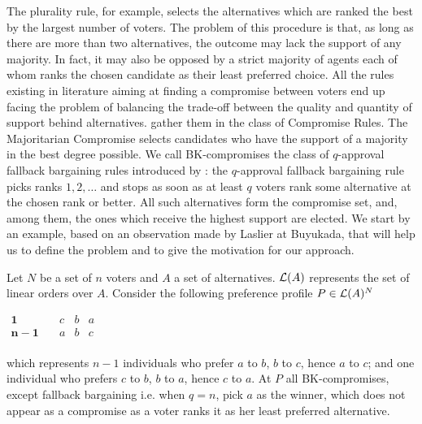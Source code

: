 \documentclass[version=3.21, pagesize, twoside=off, bibliography=totoc, DIV=calc, fontsize=12pt, a4paper]{scrartcl}
\begin{document}
The plurality rule, for example, selects the alternatives which are ranked the best by the largest number of voters. The problem of this procedure is that, as long as there are more than two alternatives, the outcome may lack the support of any majority. In fact, it may also be opposed by a strict majority of agents each of whom ranks the chosen candidate as their least preferred choice. All the rules existing in literature aiming at finding a compromise between voters end up facing the problem of balancing the trade-off between the quality and quantity of support behind alternatives. \citet{Merlin2019} gather them in the class of Compromise Rules. The Majoritarian Compromise \citep{Sertel1999} selects candidates who have the support of a majority in the best degree possible. 
We call BK-compromises the class of $q$-approval fallback bargaining rules introduced by \citet{Brams2001}: the $q$-approval fallback bargaining rule picks ranks $1, 2, \dots$ and stops as soon as at least $q$ voters rank some alternative at the chosen rank or better. All such alternatives form the compromise set, and, among them, the ones which receive the highest support are elected.
We start by an example, based on an observation made by Laslier at Buyukada, that will help us to define the problem and to give the motivation for our approach.

\begin{example}
	\label{ex:ex1}
	Let $N$ be a set of $n$ voters and $A$ a set of alternatives. $\mathcal{L}(A)$ represents the set of linear orders over $A$. Consider the following preference profile $P\in \mathcal{L}(A)^{N}$
	\begin{center}
		$
		\begin{array}{cccc}
		\mathbf{1} \quad &c&b&a\\
		\mathbf{n-1} \quad &a&b&c\\
		\end{array}
		$
	\end{center}
	which represents $n-1$ individuals who prefer $a$ to $b$, $b$ to $c$, hence $a$ to $c$; and one individual who prefers $c$ to $b$, $b$ to $a$, hence $c$ to $a $. At $P$ all BK-compromises, except fallback bargaining i.e. when $q=n$, pick $a$ as the winner, which does not appear as a compromise as a voter ranks it as her least preferred alternative.
\end{example}
\end{document}
